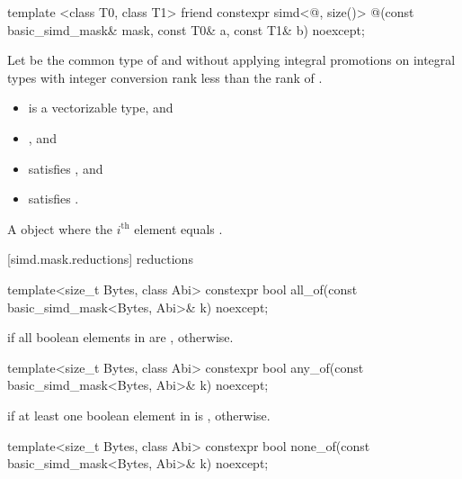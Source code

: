 \begin{itemdecl}
template <class T0, class T1>
  friend constexpr simd<@\seebelow@, size()>
    @\simdselect@(const basic_simd_mask& mask, const T0& a, const T1& b) noexcept;
\end{itemdecl}

\begin{itemdescr}
  \pnum Let  be the common type of  and  without
  applying integral promotions on integral types with integer conversion rank
  less than the rank of .

  \pnum\constraints
  \begin{itemize}
    \item {} is a vectorizable type, and
    \item {}, and
    \item {} satisfies , and
    \item {} satisfies .
  \end{itemize}

  \pnum\returns
  A  object where the $i^\text{th}$ element equals  \foralli.
\end{itemdescr}

[simd.mask.reductions]{ reductions}

\begin{itemdecl}
template<size_t Bytes, class Abi>
  constexpr bool all_of(const basic_simd_mask<Bytes, Abi>& k) noexcept;
\end{itemdecl}

\begin{itemdescr}
  \pnum\returns
   if all boolean elements in  are ,  otherwise.
\end{itemdescr}

\begin{itemdecl}
template<size_t Bytes, class Abi>
  constexpr bool any_of(const basic_simd_mask<Bytes, Abi>& k) noexcept;
\end{itemdecl}

\begin{itemdescr}
  \pnum\returns
   if at least one boolean element in  is ,  otherwise.
\end{itemdescr}

\begin{itemdecl}
template<size_t Bytes, class Abi>
  constexpr bool none_of(const basic_simd_mask<Bytes, Abi>& k) noexcept;
\end{itemdecl}

